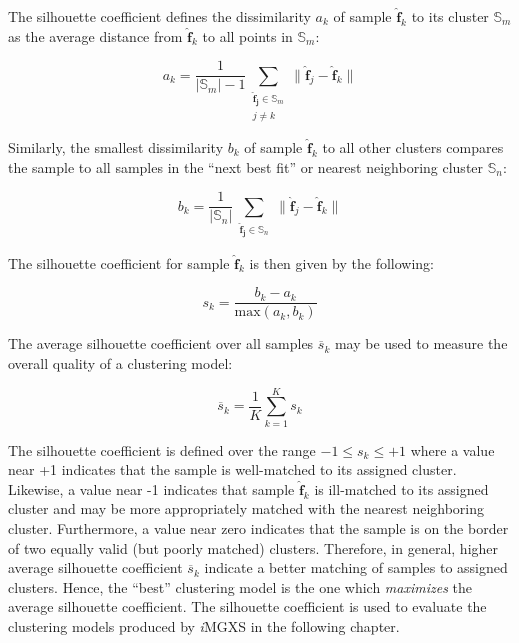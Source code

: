 The silhouette coefficient defines the dissimilarity $a_{k}$ of sample $\boldsymbol{\hat{f}}_{k}$ to its cluster $\mathbb{S}_{m}$ as the average distance from $\boldsymbol{\hat{f}}_{k}$ to all points in $\mathbb{S}_{m}$:

\begin{equation}
\label{eqn:chap10-silhouette-a}
a_{k} = \frac{1}{|\mathbb{S}_{m}|-1} \displaystyle\sum\limits_{\substack{\boldsymbol{\hat{f}_{j}} \in \mathbb{S}_{m}\\ j \ne k}} \|\boldsymbol{\hat{f}}_{j} - \boldsymbol{\hat{f}}_{k}\|
\end{equation}

\noindent Similarly, the smallest dissimilarity $b_{k}$ of sample $\boldsymbol{\hat{f}}_{k}$ to all other clusters compares the sample to all samples in the ``next best fit'' or nearest neighboring cluster $\mathbb{S}_{n}$:

\begin{equation}
\label{eqn:chap10-silhouette-b}
b_{k} = \frac{1}{|\mathbb{S}_{n}|} \displaystyle\sum\limits_{\substack{\boldsymbol{\hat{f}_{j}} \in \mathbb{S}_{n}}} \|\boldsymbol{\hat{f}}_{j} - \boldsymbol{\hat{f}}_{k}\|
\end{equation}

\noindent The silhouette coefficient for sample $\boldsymbol{\hat{f}}_{k}$ is then given by the following:

\begin{equation}
\label{eqn:chap10-silhouette}
s_{k} = \frac{b_{k}-a_{k}}{\textrm{max}(a_{k},b_{k})}
\end{equation}

\noindent The average silhouette coefficient over all samples $\overline{s}_{k}$ may be used to measure the overall quality of a clustering model:

\begin{equation}
\label{eqn:chap10-silhouette-mean}
\overline{s}_{k} = \frac{1}{K} \displaystyle\sum\limits_{k=1}^{K} s_{k}
\end{equation}

The silhouette coefficient is defined over the range $-1 \le s_{k} \le +1$ where a value near +1 indicates that the sample is well-matched to its assigned cluster. Likewise, a value near -1 indicates that sample $\boldsymbol{\hat{f}}_{k}$ is ill-matched to its assigned cluster and may be more appropriately matched with the nearest neighboring cluster. Furthermore, a value near zero indicates that the sample is on the border of two equally valid (but poorly matched) clusters. Therefore, in general, higher average silhouette coefficient $\overline{s}_{k}$ indicate a better matching of samples to assigned clusters. Hence, the ``best'' clustering model is the one which \textit{maximizes} the average silhouette coefficient. The silhouette coefficient is used to evaluate the clustering models produced by \textit{i}\ac{MGXS} in the following chapter.

